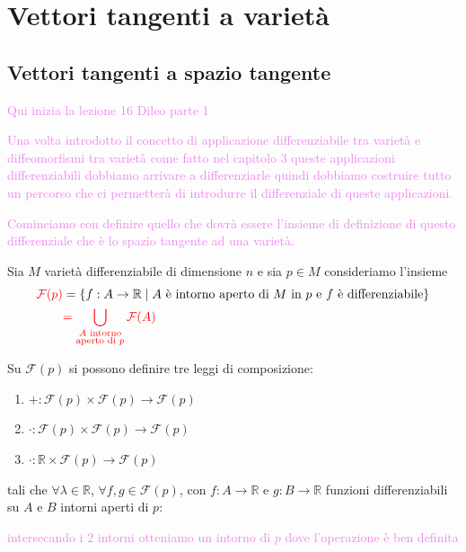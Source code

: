 \chapter{Vettori tangenti a varietà}
    \section{Vettori tangenti a spazio tangente}
        \textcolor{violet}{Qui inizia la lezione 16 Dileo parte 1}

        \textcolor{violet}{Una volta introdotto il concetto di applicazione differenziabile tra varietà e diffeomorfismi tra varietà come fatto nel capitolo $3$
        queste applicazioni differenziabili dobbiamo arrivare a differenziarle quindi dobbiamo costruire tutto un percorso che ci permetterà 
        di introdurre il differenziale di queste applicazioni.}

        \textcolor{violet}{Cominciamo con definire quello che dovrà essere l'insieme di definizione di questo differenziale che è lo spazio tangente ad una varietà.}

        Sia $M$ varietà differenziabile di dimensione $n$ e sia $p \in M$ consideriamo l'insieme
        \begin{align*}
        \textcolor{red}{\mathcal{F}(p)} &= \left\{ f : A \to \mathbb{R} \;\middle|\; A \text{ è intorno aperto di } M \text{ in } p \text{ e } f \text{ è differenziabile} \right\} \\
        &\textcolor{red}{= \bigcup_{\substack{A \text{ intorno} \\ \text{aperto di } p}} \mathcal{F}(A)}
        \end{align*}

        Su $\mathcal{F}(p)$ si possono definire tre leggi di composizione:
        \begin{enumerate}
        \item $+ : \mathcal{F}(p) \times \mathcal{F}(p) \to \mathcal{F}(p)$
        \item $\boldsymbol{\cdot} : \mathcal{F}(p) \times \mathcal{F}(p) \to \mathcal{F}(p)$
        \item $\boldsymbol{\cdot} : \mathbb{R} \times \mathcal{F}(p) \to \mathcal{F}(p)$
        \end{enumerate}
        tali che $\forall \lambda \in \mathbb{R}$, $\forall f, g \in \mathcal{F}(p)$, con $f : A \to \mathbb{R}$ e $g : B \to \mathbb{R}$ funzioni differenziabili su $A$ e $B$ intorni aperti di $p$:
        
        \textcolor{violet}{intersecando i $2$ intorni otteniamo un intorno di $p$ dove l'operazione è ben definita}
        
